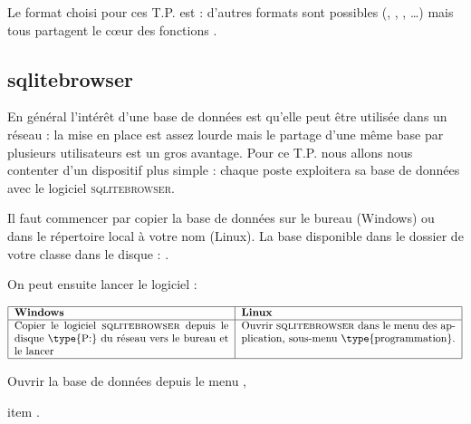 Le format choisi pour ces T.P. est  : d'autres formats sont possibles (, , , \dots) mais tous partagent le cœur des fonctions .
\subsection{sqlitebrowser}
En général l'intérêt d'une base de données est qu'elle peut être utilisée dans un réseau : la mise en place est assez lourde mais le partage d'une même base par plusieurs utilisateurs est un gros avantage. Pour ce T.P. nous allons nous contenter d'un dispositif plus simple : chaque poste exploitera sa base de données avec le logiciel  \textsc{sqlitebrowser}.

Il faut commencer par copier la base de données sur le bureau (Windows) ou dans le répertoire local à votre nom (Linux). La base disponible dans le dossier de votre classe dans le disque  : .

On peut ensuite lancer le logiciel :

\[
\begin{tabular}{|p{7cm}|p{7cm}|}
\hline
\bf Windows  & \bf Linux \\ 
\hline
Copier le logiciel \textsc{sqlitebrowser} depuis le disque \type{P:} du réseau vers le bureau et le lancer
&
Ouvrir \textsc{sqlitebrowser} dans le menu des application, sous-menu \type{programmation}. \\ 
\hline
\end{tabular}
\]

Ouvrir la base de données  depuis le menu , 

item .

